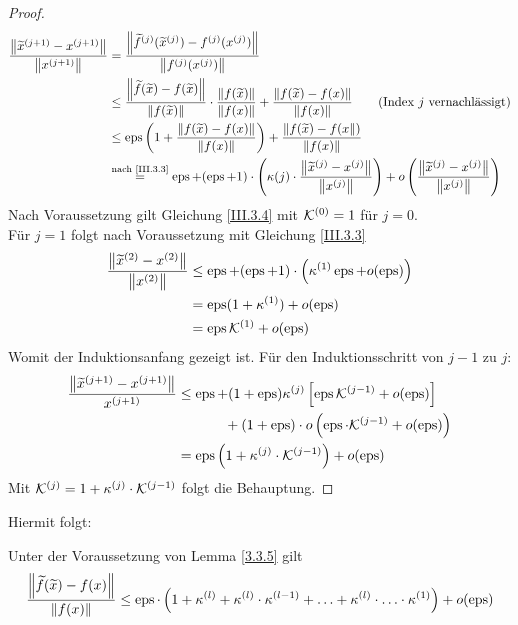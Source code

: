 \begin{proof}
  \begin{align*}
    \frac{\nn[\widetilde{x}^{(j+1)}-x^{(j+1)}]}{\nn[x^{(j+1)}]}
    &= \frac{\nn[\widetilde{f}^{(j)}(\widetilde{x}^{(j)})-f^{(j)}(x^{(j)})]}
      {\nn[f^{(j)}(x^{(j)})]} \\
    &\leq \frac{\nn[\widetilde{f}(\widetilde{x})-f(\widetilde{x})]}{\nn[f(\widetilde{x})]}
      \cdot \frac{\nn[f(\widetilde{x})]}{\nn[f(x)]}
      + \frac{\nn[f(\widetilde{x})-f({x})]}{\nn[f(x)]} 
      \quad\quad \text{(Index $j$ vernachlässigt)}\\
    &\leq \Eps \left( 1+ \frac{\nn[f(\widetilde{x})-f({x})]}{\nn[f(x)]}\right)
      + \frac{\nn[f(\widetilde{x})-f({x}])}{\nn[f(x)]}\\
    &\overset{\text{nach \ref{III.3.3}}}{=} \Eps + (\Eps+1) \cdot 						\left(\kappa{(j)}\cdot \frac{\nn[\widetilde{x}^{(j)}-x^{(j)}]}{\nn[x^{(j)}]}\right)
      + o\left( \frac{\nn[\widetilde{x}^{(j)}-x^{(j)}]}{\nn[x^{(j)}]}\right)
  \end{align*}
  Nach Voraussetzung gilt Gleichung \eqref{III.3.4}  mit $\K^{(0)}=1$ für $j=0$. \\
  Für $j=1$ folgt nach Voraussetzung mit Gleichung \eqref{III.3.3}
  \begin{align*}
    \frac{\nn[\widetilde{x}^{(2)}-x^{(2)}]}{\nn[x^{(2)}]}
    & \leq \Eps +(\Eps+1) \cdot \left( \kappa^{(1)}\Eps+ o(\Eps)\right) \\
    &= \Eps(1+\kappa^{(1)}) + o(\Eps) \\
    &= \Eps\K^{(1)} + o(\Eps)
  \end{align*}
  Womit der Induktionsanfang gezeigt ist.
  Für den Induktionsschritt von $j-1$ zu $j$:
  \begin{align*}
    \frac{\nn[\widetilde{x}^{(j+1)}-x^{(j+1)}]}{x^{(j+1)}}
    & \leq \Eps + (1+\Eps)\kappa^{(j)} \left[ \Eps \K^{(j-1)}+ o(\Eps) \right] \\
    &\phantom{\leq \Eps+} + (1+\Eps) \cdot o\left( \Eps\cdot \K^{(j-1)} +o(\Eps)\right) \\
    &= \Eps\left(1+\kappa^{(j)}\cdot \K^{(j-1)}\right)+ o(\Eps)
  \end{align*}
  Mit $\K^{(j)} = 1+ \kappa^{(j)}\cdot \K^{(j-1)}$ folgt die Behauptung.
\end{proof}

Hiermit folgt:

\begin{Kore}
  \label{3.3.6}
  Unter der Voraussetzung von Lemma \ref{3.3.5} gilt
  \begin{gather}
    \frac{\nn[\widetilde{f}(\widetilde{x})-f(x)]}{\nn[f(x)]} \leq 
    \Eps\cdot \left( 1+\kappa^{(l)}+ \kappa^{(l)}\cdot \kappa^{(l-1)}+ \dotsc
      + \kappa^{(l)}\cdot \dotsc \cdot \kappa^{(1)}\right) + o(\Eps) 
    \label{III.3.5}
  \end{gather}~
\end{Kore}

